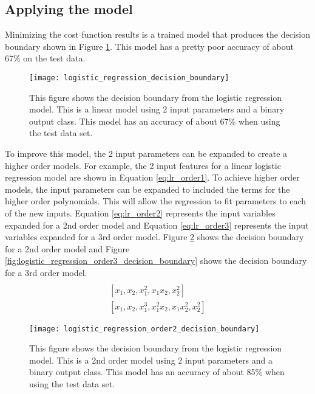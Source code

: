 \subsection{Applying the model}
Minimizing the cost function results is a trained model that produces the decision boundary shown in Figure \ref{fig:logistic_regression_decision_boundary}.  This model has a pretty poor accuracy of about 67\% on the test data.

\begin{figure}
	\centering
	\texttt{[image: logistic\_regression\_decision\_boundary]}
	\decoRule
	\caption{This figure shows the decision boundary from the logistic regression model.  This is a linear model using 2 input parameters and a binary output class.  This model has an accuracy of about 67\% when using the test data set.}
	\label{fig:logistic_regression_decision_boundary}
\end{figure}

To improve this model, the 2 input parameters can be expanded to create a higher order models.  For example, the 2 input features for a linear logistic regression model are shown in Equation \ref{eq:lr_order1}.  To achieve higher order models, the input parameters can be expanded to included the terms for the higher order polynomials.  This will allow the regression to fit parameters to each of the new inputs.  Equation \ref{eq:lr_order2} represents the input variables expanded for a 2nd order model and Equation \ref{eq:lr_order3} represents the input variables expanded for a 3rd order model.  Figure \ref{fig:logistic_regression_order2_decision_boundary} shows the decision boundary for a 2nd order model and Figure \ref{fig:logistic_regression_order3_decision_boundary} shows the decision boundary for a 3rd order model.
\begin{align}
	[x_1, x_2]  \label{eq:lr_order1} \\
	[x_1, x_2, x_1^2, x_1 x_2, x_2^2] \label{eq:lr_order2} \\
	[x_1, x_2, x_1^3, x_1^2 x_2, x_1 x_2^2, x_2^2] \label{eq:lr_order3}
\end{align}

\begin{figure}
	\centering
	\texttt{[image: logistic\_regression\_order2\_decision\_boundary]}
	\decoRule
	\caption{This figure shows the decision boundary from the logistic regression model.  This is a 2nd order model using 2 input parameters and a binary output class.  This model has an accuracy of about 85\% when using the test data set.}
	\label{fig:logistic_regression_order2_decision_boundary}
\end{figure}

